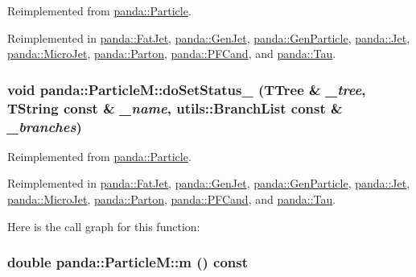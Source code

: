 Reimplemented from \hyperlink{classpanda_1_1Particle_a96e604e87ef1bc5931b4cd3da447b084}{panda::Particle}.

Reimplemented in \hyperlink{classpanda_1_1FatJet_a3f92ff4d7d7bb8f83fa43e4ef20bc036}{panda::FatJet}, \hyperlink{classpanda_1_1GenJet_ac0e79d0ee45b00c8477d376f81008204}{panda::GenJet}, \hyperlink{classpanda_1_1GenParticle_a05d969dcffe56d821bb1b73bdb084d6c}{panda::GenParticle}, \hyperlink{classpanda_1_1Jet_a4e59030d68ca3a27fb72f0c0976bdb27}{panda::Jet}, \hyperlink{classpanda_1_1MicroJet_a6a8758a218f0e0ce60a1af0a999ff598}{panda::MicroJet}, \hyperlink{classpanda_1_1Parton_a2ab83f4fa3a99a93c7bf17ab2233a25a}{panda::Parton}, \hyperlink{classpanda_1_1PFCand_a2b6d101e2b1391e4c942b1f5ec2f6151}{panda::PFCand}, and \hyperlink{classpanda_1_1Tau_a49f42dffab89a0699caff1da8d7993ed}{panda::Tau}.\hypertarget{classpanda_1_1ParticleM_a042f9e295576be022960ea88144e9022}{
\subsubsection[{doSetStatus\_\-}]{\setlength{\rightskip}{0pt plus 5cm}void panda::ParticleM::doSetStatus\_\- (TTree \& {\em \_\-tree}, \/  TString const \& {\em \_\-name}, \/  {\bf utils::BranchList} const \& {\em \_\-branches})}}
\label{classpanda_1_1ParticleM_a042f9e295576be022960ea88144e9022}


Reimplemented from \hyperlink{classpanda_1_1Particle_aa30d821beea5e8f3d83580baf162a014}{panda::Particle}.

Reimplemented in \hyperlink{classpanda_1_1FatJet_ad63603b0bd69d4e3b6173a194b3e6829}{panda::FatJet}, \hyperlink{classpanda_1_1GenJet_a519508188c474ac1dcc2c822de9e43c3}{panda::GenJet}, \hyperlink{classpanda_1_1GenParticle_a41d0169feced73ebddb43bf9547cecdf}{panda::GenParticle}, \hyperlink{classpanda_1_1Jet_a494d27c6c2b773f5849996944cf46eb2}{panda::Jet}, \hyperlink{classpanda_1_1MicroJet_ae7b83b860f85cc86b736495317fb7f3a}{panda::MicroJet}, \hyperlink{classpanda_1_1Parton_a4471a7ad47570d85d6cd5ffa3c67b4d2}{panda::Parton}, \hyperlink{classpanda_1_1PFCand_a263dcf1e5a9b704827d4b4af006ebcf4}{panda::PFCand}, and \hyperlink{classpanda_1_1Tau_a96eda4638f1fd6968f3a31757253600e}{panda::Tau}.

Here is the call graph for this function:\hypertarget{classpanda_1_1ParticleM_a3285647972bb49a26897e300f990b902}{
\subsubsection[{m}]{\setlength{\rightskip}{0pt plus 5cm}double panda::ParticleM::m () const}}
\label{classpanda_1_1ParticleM_a3285647972bb49a26897e300f990b902}


